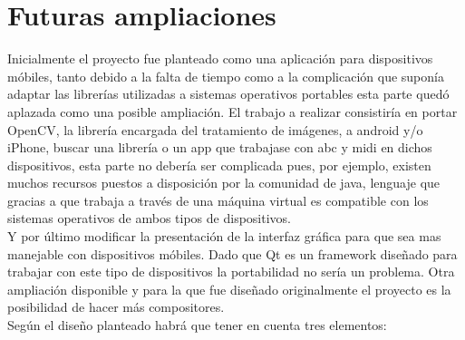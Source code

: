 \section{Futuras ampliaciones}

Inicialmente el proyecto fue planteado como una aplicación para dispositivos móbiles, tanto debido a la falta de tiempo como a la complicación que suponía adaptar las librerías utilizadas a sistemas operativos portables esta parte quedó aplazada como una posible ampliación.
\newline
El trabajo a realizar consistiría en portar OpenCV, la librería encargada del tratamiento de imágenes, a android y/o iPhone, buscar una librería o un app que trabajase con abc y midi en dichos dispositivos, esta parte no debería ser complicada pues, por ejemplo, existen muchos recursos puestos a disposición por la comunidad de java, lenguaje que gracias a que trabaja a través de una máquina virtual es compatible con los sistemas operativos de ambos tipos de dispositivos.
\\Y por último modificar la presentación de la interfaz gráfica para que sea mas manejable con dispositivos móbiles. Dado que Qt es un framework diseñado para trabajar con este tipo de dispositivos la portabilidad no sería un problema.
\newline
Otra ampliación disponible y para la que fue diseñado originalmente el proyecto es la posibilidad de hacer más compositores.
\\Según el diseño planteado habrá que tener en cuenta tres elementos:
